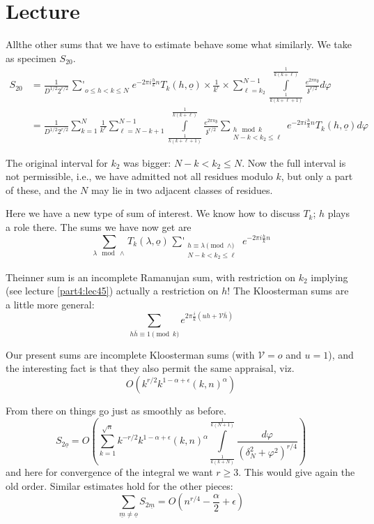 \chapter{Lecture}\label{part4:lec46} %

All\pageoriginale the other sums that we have to estimate behave some
what similarly. We take as specimen $S_{20}$.
\begin{align*}
  S_{20} & = \frac{1}{D^{1/2}2^{r/2}} \mathop{\textstyle{\sum'}}_{o
    \leq h < k\leq N} e^{-2 \pi i \frac{h}{k}n} T_k (h, \underline{o})
  \times \frac{1}{k^r} \times \sum^{N-1}_{\ell=k_2}
  \int\limits^{\frac{1}{k(k+\ell)}}_{\frac{1}{k(k+\ell+1)}} \frac{e^{2
    \pi n \mathfrak{z}}}{\mathfrak{z}^{r/2}} d \varphi\\
  & = \frac{1}{D^{1/2} 2^{r/2}} \sum^N_{k=1} \frac{1}{k^r}
  \sum^{N-1}_{\ell=N-k+1} \int\limits^{\frac{1}{k(k+\ell)}}_{\frac{1}{k(k+
      \ell+1)}} \frac{e^{2 \pi n \mathfrak{z}}}{\mathfrak{z}^{r/2}}
  \sum_{\substack{h \mod k\\N-k < k_2 \leq \ell}} e^{-2 \pi i
    \frac{h}{k}n} T_k (h, \underline{o}) d \varphi
\end{align*}

The original interval for $k_2$ was bigger: $N - k < k_2 \leq N$. Now
the full interval is not permissible, i.e., we have admitted not all
residues modulo $k$, but only a part of these, and the $N$ may lie in
two adjacent classes of residues.

Here we have a new type of sum of interest. We know how to discuss
$T_k$; $h$ plays a role there. The sums we have now get are
$$
\sum_{\lambda \mod \wedge} T_k (\lambda, \underline{o})
\mathop{\textstyle{\sum'}}_{\substack{h \equiv \lambda
    \pmod{\wedge}\\N-k < k_2 \leq \ell}} e^{-2 \pi i \frac{h}{k}n}
$$

The\pageoriginale inner sum is an incomplete Ramanujan sum, with
restriction on $k_2$ implying (see lecture \ref{part4:lec45}) actually a restriction
on $h!$ The Kloosterman sums are a little more general:
$$
\sum_{h \bar{h} \equiv 1 \pmod{k}} e^{2 \pi \frac{i}{k} (uh +
    \mathscr{V}\bar{h})} 
$$

Our present sums are incomplete Kloosterman sums (with $\mathscr{V}=o$
and $u=1$), and the interesting fact is that they also permit the same
appraisal, viz.
$$
O \left(k^{r/2} k^{1- \alpha + \epsilon} (k, n)^\alpha \right)
$$

From there on things go just as smoothly as before.
$$
S_{2\underline{o}} =O \left(\sum^{\sqrt{n}}_{k=1} k^{- r/2} k^{1-
\alpha + \epsilon} (k, n)^\alpha
\int\limits^{\frac{1}{k(N+1)}}_{\frac{1}{k(k+N)}} \frac{d
  \varphi}{(\delta^2_N + \varphi^2)^{r/4}}\right)
$$
and here for convergence of the integral we want $r \geq 3$. This
would give again the old order. Similar estimates hold for the other
pieces:
$$
\sum_{\underline{m} \neq \underline{o}} S_{2 \underline{m}} = O
\left(n^{r/4} - \frac{\alpha}{2}+ \epsilon \right)
$$

